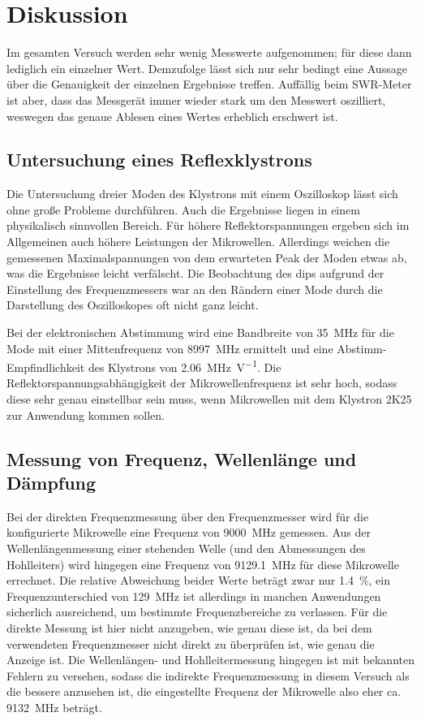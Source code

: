 \section{Diskussion}
\label{sec:diskussion}

Im gesamten Versuch werden sehr wenig Messwerte aufgenommen; für diese dann lediglich ein einzelner Wert.
Demzufolge lässt sich nur sehr bedingt eine Aussage über die Genauigkeit der einzelnen Ergebnisse treffen.
Auffällig beim SWR-Meter ist aber, dass das Messgerät immer wieder stark um den Messwert oszilliert, weswegen das genaue Ablesen eines Wertes erheblich erschwert ist.

\subsection{Untersuchung eines Reflexklystrons}

Die Untersuchung dreier Moden des Klystrons mit einem Oszilloskop lässt sich ohne große Probleme durchführen.
Auch die Ergebnisse liegen in einem physikalisch sinnvollen Bereich.
Für höhere Reflektorspannungen ergeben sich im Allgemeinen auch höhere Leistungen der Mikrowellen.
Allerdings weichen die gemessenen Maximalspannungen von dem erwarteten Peak der Moden etwas ab, was die Ergebnisse leicht verfälscht.
Die Beobachtung des dips aufgrund der Einstellung des Frequenzmessers war an den Rändern einer Mode durch die Darstellung des Oszilloskopes oft nicht ganz leicht.

Bei der elektronischen Abstimmung wird eine Bandbreite von \SI{35}{\mega\hertz} für die Mode mit einer Mittenfrequenz von \SI{8997}{\mega\hertz} ermittelt und eine Abstimm-Empfindlichkeit des Klystrons von \SI{2.06}{\mega\hertz\per\volt}.
Die Reflektorspannungsabhängigkeit der Mikrowellenfrequenz ist sehr hoch, sodass diese sehr genau einstellbar sein muss, wenn Mikrowellen mit dem Klystron 2K25 zur Anwendung kommen sollen.

\subsection{Messung von Frequenz, Wellenlänge und Dämpfung}

Bei der direkten Frequenzmessung über den Frequenzmesser wird für die konfigurierte Mikrowelle eine Frequenz von \SI{9000}{\mega\hertz} gemessen.
Aus der Wellenlängenmessung einer stehenden Welle (und den Abmessungen des Hohlleiters) wird hingegen eine Frequenz von \SI{9129.1}{\mega\hertz} für diese Mikrowelle errechnet.
Die relative Abweichung beider Werte beträgt zwar nur \SI{1.4}{\percent}, ein Frequenzunterschied von \SI{129}{\mega\hertz} ist allerdings in manchen Anwendungen sicherlich ausreichend, um bestimmte Frequenzbereiche zu verlassen.
Für die direkte Messung ist hier nicht anzugeben, wie genau diese ist, da bei dem verwendeten Frequenzmesser nicht direkt zu überprüfen ist, wie genau die Anzeige ist.
Die Wellenlängen- und Hohlleitermessung hingegen ist mit bekannten Fehlern zu versehen, sodass die indirekte Frequenzmessung in diesem Versuch als die bessere anzusehen ist, die eingestellte Frequenz der Mikrowelle also eher ca. \SI{9132}{\mega\hertz} beträgt.

